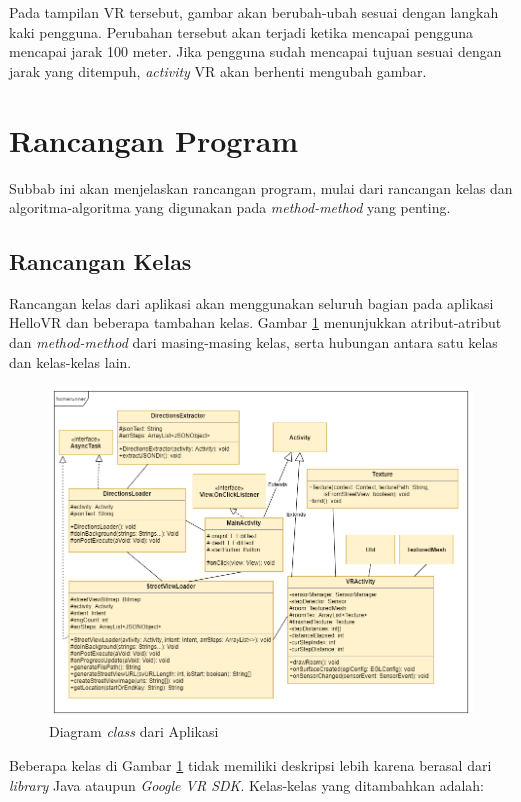 Pada tampilan VR tersebut, gambar akan berubah-ubah sesuai dengan langkah kaki pengguna. Perubahan tersebut akan terjadi ketika mencapai pengguna mencapai jarak 100 meter. Jika pengguna sudah mencapai tujuan sesuai dengan jarak yang ditempuh, \textit{activity} VR akan berhenti mengubah gambar.     

\section{Rancangan Program}
Subbab ini akan menjelaskan rancangan  program, mulai dari rancangan kelas dan algoritma-algoritma yang digunakan pada \textit{method-method} yang penting. 

\subsection{Rancangan Kelas}
Rancangan kelas dari aplikasi akan menggunakan seluruh bagian pada aplikasi HelloVR dan beberapa tambahan kelas. Gambar \ref{fig:class-diagram} menunjukkan atribut-atribut dan \textit{method-method} dari masing-masing kelas, serta hubungan antara satu kelas dan kelas-kelas lain. 

\begin{figure}[h]
	\centering
		\includegraphics[scale=0.6]{Gambar/class-diagram.png}
	\caption{Diagram \textit{class} dari Aplikasi}
	\label{fig:class-diagram}
\end{figure}

Beberapa kelas di Gambar \ref{fig:class-diagram} tidak memiliki deskripsi lebih karena berasal dari \textit{library} Java ataupun \textit{Google VR SDK}. Kelas-kelas yang ditambahkan adalah:

